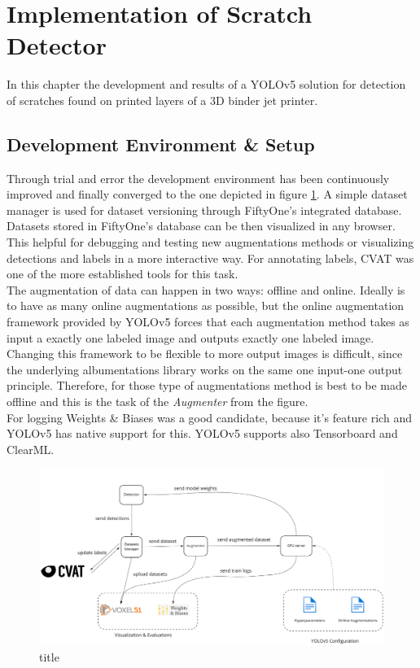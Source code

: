 \section{Implementation of Scratch Detector}
In this chapter the development and results of a YOLOv5 solution for detection of scratches found on printed layers of a 3D binder jet printer.
\subsection{Development Environment \& Setup}
Through trial and error the development environment has been continuously improved and finally converged to the one depicted in figure \ref{fig:setup}. A simple dataset manager is used for dataset versioning through FiftyOne's \cite{fiftyone_git} integrated database. Datasets stored in FiftyOne's database can be then visualized in any browser. This helpful for debugging and testing new augmentations methods or visualizing detections and labels in a more interactive way. For annotating labels, CVAT \cite{cvat_git} was one of the more established tools for this task. \\
The augmentation of data can happen in two ways: offline and online. Ideally is to have as many online augmentations as possible, but the online augmentation framework provided by YOLOv5 forces that each augmentation method takes as input a exactly one labeled image and outputs exactly one labeled image. Changing this framework to be flexible to more output images is difficult, since the underlying albumentations library \cite{albumentations_site} works on the same one input-one output principle. Therefore, for those type of augmentations method is best to be made offline and this is the task of the \textit{Augmenter} from the figure. \\
For logging Weights \& Biases \cite{wandb_site} was a good candidate, because it's feature rich and YOLOv5 has native support for this. YOLOv5 supports also Tensorboard and ClearML.\\

 \begin{figure}[!h]
  \includegraphics[width=\textwidth]{images/setup}
  \caption{title}
  \label{fig:setup}
\end{figure}

